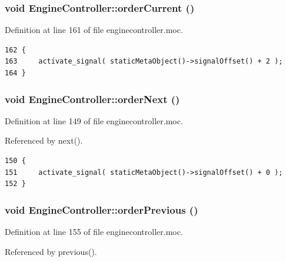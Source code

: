 \subsubsection{\setlength{\rightskip}{0pt plus 5cm}void Engine\-Controller::order\-Current ()\hspace{0.3cm}{\tt  [signal]}}\label{classEngineController_EngineControllerl2}




Definition at line 161 of file enginecontroller.moc.



\footnotesize\begin{verbatim}162 {
163     activate_signal( staticMetaObject()->signalOffset() + 2 );
164 }
\end{verbatim}\normalsize 
{}
\subsubsection{\setlength{\rightskip}{0pt plus 5cm}void Engine\-Controller::order\-Next ()\hspace{0.3cm}{\tt  [signal]}}\label{classEngineController_EngineControllerl0}




Definition at line 149 of file enginecontroller.moc.

Referenced by next().



\footnotesize\begin{verbatim}150 {
151     activate_signal( staticMetaObject()->signalOffset() + 0 );
152 }
\end{verbatim}\normalsize 
{}
\subsubsection{\setlength{\rightskip}{0pt plus 5cm}void Engine\-Controller::order\-Previous ()\hspace{0.3cm}{\tt  [signal]}}\label{classEngineController_EngineControllerl1}




Definition at line 155 of file enginecontroller.moc.

Referenced by previous().



